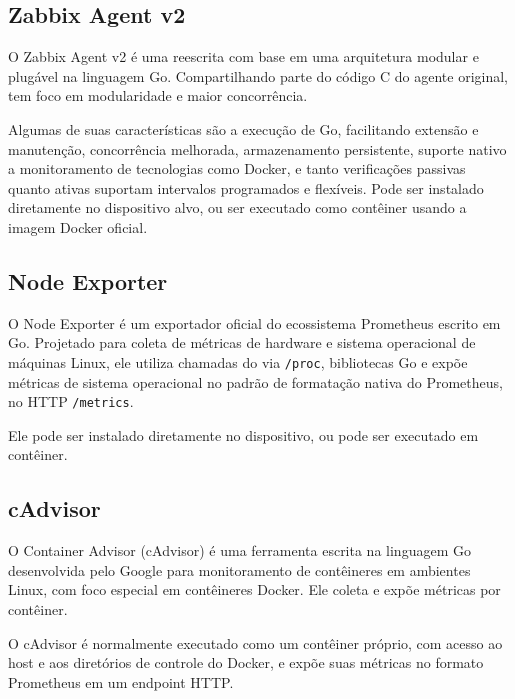 \subsection{Zabbix Agent v2}
\label{subsection:ZabbixAgentV2}

O Zabbix Agent v2 \citep{zabbix2025} é uma reescrita com base em uma arquitetura modular e plugável na linguagem Go. Compartilhando parte do código C do agente original, tem foco em modularidade e maior concorrência.

Algumas de suas características são a execução de  Go, facilitando extensão e manutenção, concorrência melhorada, armazenamento persistente, suporte nativo a monitoramento de tecnologias como Docker, e tanto verificações passivas quanto ativas suportam intervalos programados e flexíveis. Pode ser instalado diretamente no dispositivo alvo, ou ser executado como contêiner usando a imagem Docker oficial.

\subsection{Node Exporter}
\label{subsection:NodeExporter}

O Node Exporter \citep{nodeexporter2025} é um exportador oficial do ecossistema Prometheus escrito em Go. Projetado para coleta de métricas de hardware e sistema operacional de máquinas Linux, ele utiliza chamadas do  via \verb|/proc|, bibliotecas Go e expõe métricas de sistema operacional no padrão de formatação nativa do Prometheus, no  HTTP \verb|/metrics|.

Ele pode ser instalado diretamente no dispositivo, ou pode ser executado em contêiner. 

\subsection{cAdvisor}
\label{subsection:cAdvisor}

O Container Advisor (cAdvisor) \citep{cadvisor2025} é uma ferramenta escrita na linguagem Go desenvolvida pelo Google para monitoramento de contêineres em ambientes Linux, com foco especial em contêineres Docker. Ele coleta e expõe métricas por contêiner.

O cAdvisor é normalmente executado como um contêiner próprio, com acesso ao host e aos diretórios de controle do Docker, e expõe suas métricas no formato Prometheus em um endpoint HTTP.

